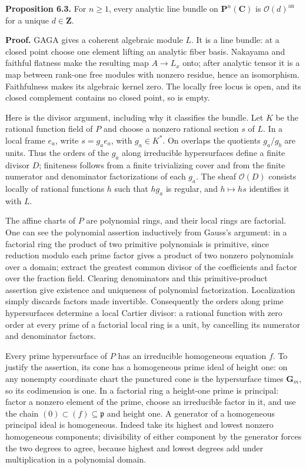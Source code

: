 \documentclass[11pt]{article}
\begin{document}
\textbf{Proposition 6.3.} For \(n\geq1\), every analytic line bundle on
\(\mathbf P^n(\mathbf C)\) is \(\mathcal O(d)^{\mathrm{an}}\) for a
unique \(d\in\mathbf Z\).

\textbf{Proof.} GAGA gives a coherent algebraic module \(L\). It is a
line bundle: at a closed point choose one element lifting an analytic
fiber basis. Nakayama and faithful flatness make the resulting map
\(A\to L_x\) onto; after analytic tensor it is a map between rank-one
free modules with nonzero residue, hence an isomorphism. Faithfulness
makes its algebraic kernel zero. The locally free locus is open, and its
closed complement contains no closed point, so is empty.

Here is the divisor argument, including why it classifies the bundle.
Let \(K\) be the rational function field of \(P\) and choose a nonzero
rational section \(s\) of \(L\). In a local frame \(e_a\), write
\(s=g_a e_a\), with \(g_a\in K^*\). On overlaps the quotients
\(g_a/g_b\) are units. Thus the orders of the \(g_a\) along irreducible
hypersurfaces define a finite divisor \(D\); finiteness follows from a
finite trivializing cover and from the finite numerator and denominator
factorizations of each \(g_a\). The sheaf \(\mathcal O(D)\) consists
locally of rational functions \(h\) such that \(hg_a\) is regular, and
\(h\mapsto hs\) identifies it with \(L\).

The affine charts of \(P\) are polynomial rings, and their local rings
are factorial. One can see the polynomial assertion inductively from
Gauss's argument: in a factorial ring the product of two primitive
polynomials is primitive, since reduction modulo each prime factor gives
a product of two nonzero polynomials over a domain; extract the greatest
common divisor of the coefficients and factor over the fraction field.
Clearing denominators and this primitive-product assertion give
existence and uniqueness of polynomial factorization. Localization
simply discards factors made invertible. Consequently the orders along
prime hypersurfaces determine a local Cartier divisor: a rational
function with zero order at every prime of a factorial local ring is a
unit, by cancelling its numerator and denominator factors.

Every prime hypersurface of \(P\) has an irreducible homogeneous
equation \(f\). To justify the assertion, its cone has a homogeneous
prime ideal of height one: on any nonempty coordinate chart the
punctured cone is the hypersurface times \(\mathbf G_m\), so its
codimension is one. In a factorial ring a height-one prime is principal:
factor a nonzero element of the prime, choose an irreducible factor in
it, and use the chain \((0)\subset(f)\subseteq\mathfrak p\) and height
one. A generator of a homogeneous principal ideal is homogeneous. Indeed
take its highest and lowest nonzero homogeneous components; divisibility
of either component by the generator forces the two degrees to agree,
because highest and lowest degrees add under multiplication in a
polynomial domain.
\end{document}
